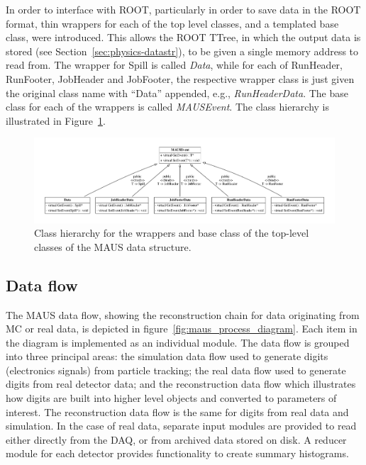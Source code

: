 \documentclass{JINST}
\begin{document}
In order to interface with ROOT, particularly in order to save data in the ROOT format, thin wrappers for each of the top level classes, and a templated base class, were introduced. This allows the ROOT TTree, in which the output data is stored (see Section~\ref{sec:physics-datastr}), to be given a single memory address to read from. The wrapper for Spill is called \emph{Data}, while for each of RunHeader, RunFooter, JobHeader and JobFooter, the respective wrapper class is just given the original class name with ``Data'' appended, e.g., \emph{RunHeaderData}. The base class for each of the wrappers is called \emph{MAUSEvent}. The class hierarchy is illustrated in Figure~\ref{fig:top-level}.

\begin{figure}[htb]
\centering
\includegraphics[width=1.03\textwidth]{figs/top_level.pdf}
\caption{Class hierarchy for the wrappers and base class of the top-level classes of the MAUS data structure.}
\label{fig:top-level}
\end{figure}

\subsection{Data flow}\label{sec:maus-dataflow}

The MAUS data flow, showing the reconstruction chain for data originating from MC or real data, is depicted in figure~\ref{fig:maus_process_diagram}. Each item in the diagram is implemented as an individual module. The data flow is grouped into three principal areas: the simulation data flow used to generate digits (electronics signals) from particle tracking; the real data flow used to generate digits from real detector data; and the reconstruction data flow which illustrates how digits are built into higher level objects and converted to parameters of interest. The reconstruction data flow is the same for digits from real data and simulation.  In the case of real data, separate input modules are provided to read either directly from the DAQ, or from archived data stored on disk. A reducer module for each detector provides functionality to create summary histograms.
\end{document}

